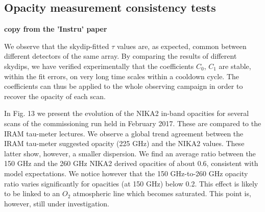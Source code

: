 \subsection{Opacity measurement consistency tests}

{\bf copy from the 'Instru' paper}
 
We observe that the skydip-fitted $\tau$ values are, as expected,
common between different detectors of the same array. By comparing
the results of different skydips, we have verified experimentally
that the coefficients $C_0$, $C_1$ are stable, within the fit
errors, on very long time scales within a cooldown cycle. The
coefficients can thus be applied to the whole observing campaign
in order to recover the opacity of each scan.

In Fig. 13 we present the evolution of the NIKA2 in-band opacities for several
scans of the commissioning run held in February 2017. These are
compared to the IRAM tau-meter lectures. We observe a global
trend agreement between the IRAM tau-meter suggested opacity
(225 GHz) and the NIKA2 values. These latter show, however,
a smaller dispersion. We find an average ratio between the
150 GHz and the 260 GHz NIKA2 derived opacities of about
0.6, consistent with model expectations. We notice however that
the 150 GHz-to-260 GHz opacity ratio varies significantly for
opacities (at 150 GHz) below 0.2. This effect is likely to be
linked to an $O_2$ atmospheric line which becomes saturated. This
point is, however, still under investigation.
